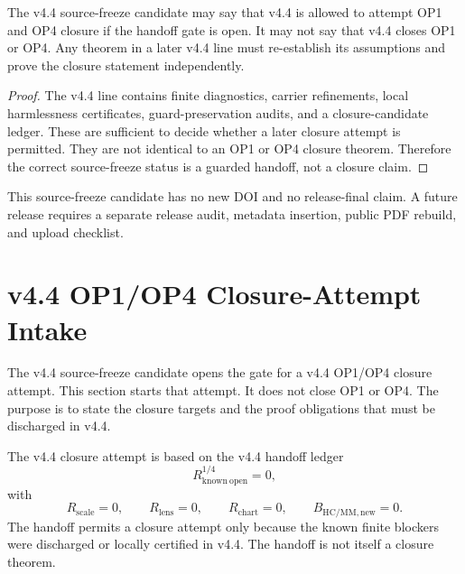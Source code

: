 \begin{theorem}
The v4.4 source-freeze candidate may say that v4.4 is allowed to attempt OP1
and OP4 closure if the handoff gate is open.  It may not say that v4.4 closes
OP1 or OP4.  Any theorem in a later v4.4 line must re-establish its assumptions
and prove the closure statement independently.
\end{theorem}

\begin{proof}
The v4.4 line contains finite diagnostics, carrier refinements, local
harmlessness certificates, guard-preservation audits, and a closure-candidate
ledger.  These are sufficient to decide whether a later closure attempt is
permitted.  They are not identical to an OP1 or OP4 closure theorem.  Therefore
the correct source-freeze status is a guarded handoff, not a closure claim.
\end{proof}

\begin{remark}
This source-freeze candidate has no new DOI and no release-final claim.  A
future release requires a separate release audit, metadata insertion, public
PDF rebuild, and upload checklist.
\end{remark}



\section{v4.4 OP1/OP4 Closure-Attempt Intake}
\label{sec:v45-op1-op4-closure-attempt-intake}

The v4.4 source-freeze candidate opens the gate for a v4.4 OP1/OP4 closure
attempt.  This section starts that attempt.  It does not close OP1 or OP4.
The purpose is to state the closure targets and the proof obligations that
must be discharged in v4.4.

\begin{definition}
The v4.4 closure attempt is based on the v4.4 handoff ledger
\[
    R_{\mathrm{known\ open}}^{1/4}=0,
\]
with
\[
    R_{\mathrm{scale}}=0,\qquad
    R_{\mathrm{lens}}=0,\qquad
    R_{\mathrm{chart}}=0,\qquad
    B_{\mathrm{HC/MM,new}}=0.
\]
The handoff permits a closure attempt only because the known finite blockers
were discharged or locally certified in v4.4.  The handoff is not itself a
closure theorem.
\end{definition}

